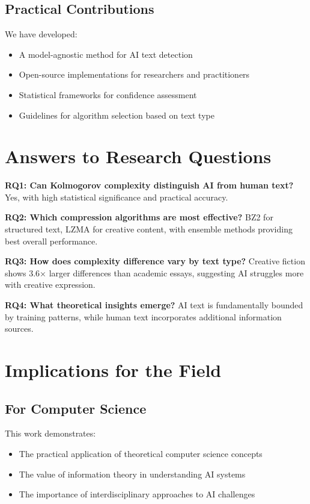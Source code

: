 \documentclass[12pt,a4paper]{report}
\begin{document}
\subsection{Practical Contributions}

We have developed:
\begin{itemize}
    \item A model-agnostic method for AI text detection
    \item Open-source implementations for researchers and practitioners
    \item Statistical frameworks for confidence assessment
    \item Guidelines for algorithm selection based on text type
\end{itemize}

\section{Answers to Research Questions}

\textbf{RQ1: Can Kolmogorov complexity distinguish AI from human text?}
Yes, with high statistical significance and practical accuracy.

\textbf{RQ2: Which compression algorithms are most effective?}
BZ2 for structured text, LZMA for creative content, with ensemble methods providing best overall performance.

\textbf{RQ3: How does complexity difference vary by text type?}
Creative fiction shows 3.6× larger differences than academic essays, suggesting AI struggles more with creative expression.

\textbf{RQ4: What theoretical insights emerge?}
AI text is fundamentally bounded by training patterns, while human text incorporates additional information sources.

\section{Implications for the Field}

\subsection{For Computer Science}

This work demonstrates:
\begin{itemize}
    \item The practical application of theoretical computer science concepts
    \item The value of information theory in understanding AI systems
    \item The importance of interdisciplinary approaches to AI challenges
\end{itemize}
\end{document}
